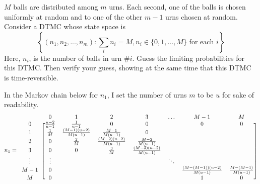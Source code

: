 \documentclass[10pt,a4paper]{exam}
\begin{document}
\begin{questions}
\question $M$ balls are distributed among $m$ urns. Each second, one of the balls is chosen uniformly at random and to one of the other $m - 1$ urns chosen at random. Consider a DTMC whose state space is
$$\left\{ (n_1, n_2, ..., n_m) : \sum_i n_i = M, n_i \in \{0,1,...,M\} \text{ for each } i \right\}$$
Here, $n_i$, is the number of balls in urn \#$i$. Guess the limiting probabilities for this DTMC. Then verify your guess, showing at the same time that this DTMC is time-reversible.

\begin{solution}
In the Markov chain below for $n_1$, I set the number of urns $m$ to be $u$ for sake of readability.
$$n_1 = \begin{blockarray}{cccccccc}
       & 0                   & 1                             & 2                             & 3                             & \dots  & M-1                               & M                          \\
\begin{block}{c[ccccccc]}
0      & \frac{u-2}{u-1} & \frac{1}{u-1}             & 0                         & 0                         &        & 0                             & 0                      \\
1      & \frac{1}{M}     & \frac{(M-1)(u-2)}{M(u-1)} & \frac{M-1}{M(u-1)}        & 0                         &        &                               &                        \\
2      & 0               & \frac{2}{M}               & \frac{(M-2)(u-2)}{M(u-1)} & \frac{M-2}{M(u-1)}        &        &                               &                        \\
3      & 0               & 0                         & \frac{3}{M}               & \frac{(M-3)(u-2)}{M(u-1)} &        &                               &                        \\
\vdots &    \vdots             &                           &                           &                           & \ddots &                               &                        \\
M-1    &   0              &                           &                           &                           &        & \frac{(M-(M-1))(u-2)}{M(u-1)} & \frac{M-(M-1)}{M(u-1)} \\
M      &      0           &                           &                           &                           &        & 1                             & 0                     \\
\end{block}
\end{blockarray} $$


\end{solution}
\end{questions}
\end{document}
